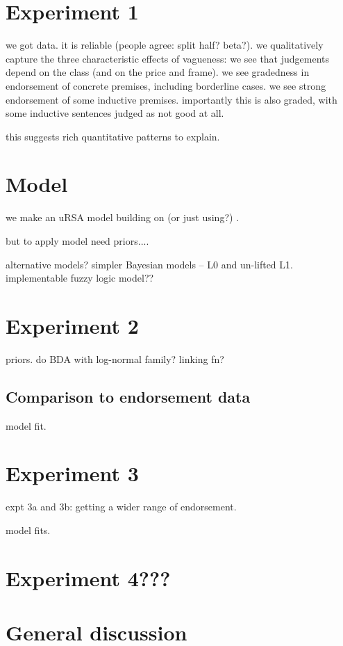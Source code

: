 \documentclass[11pt]{amsart}
\begin{document}
\section{Experiment 1}
\label{exp1}

we got data. it is reliable (people agree: split half? beta?).
we qualitatively capture the three characteristic effects of vagueness:
  we see that judgements depend on the class (and on the price and frame).
  we see gradedness in endorsement of concrete premises, including borderline cases.
  we see strong endorsement of some inductive premises. importantly this is also graded, with some inductive sentences judged as not good at all.
  
this suggests rich quantitative patterns to explain.

\section{Model}
\label{model}

we make an uRSA model building on (or just using?) \cite{lassiter2015}.

but to apply model need priors....

alternative models? simpler Bayesian models -- L0 and un-lifted L1. implementable fuzzy logic model??

\section{Experiment 2}
\label{priors}
priors. do BDA with log-normal family? linking fn?

\subsection{Comparison to endorsement data}
model fit. 

\section{Experiment 3}
\label{exp3}

expt 3a and 3b: getting a wider range of endorsement. 

model fits.

\section{Experiment 4???}

\section{General discussion}
\label{gd}
\end{document}
